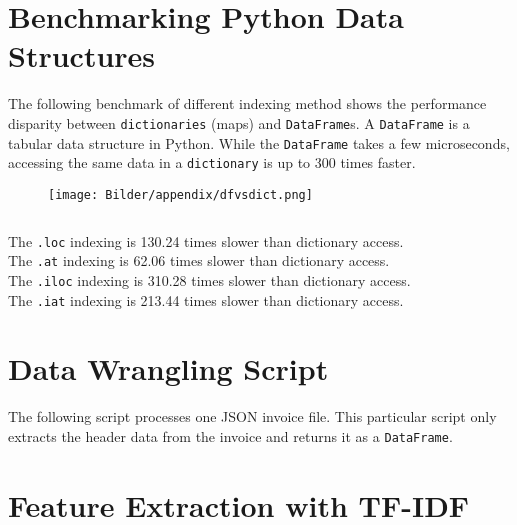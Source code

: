 \section{Benchmarking Python Data Structures}
\label{benchmarkDF}

The following benchmark of different indexing method shows the performance disparity between \lstinline|dictionaries| (maps) and \lstinline|DataFrame|s. A \lstinline|DataFrame| is a tabular data structure in Python. While the \lstinline|DataFrame| takes a few microseconds, accessing the same data in a \lstinline|dictionary| is up to 300 times faster.

\begin{figure}[h!]
	\texttt{[image: Bilder/appendix/dfvsdict.png]}
	\label{benchmarkDF}
\end{figure}
\begin{lstlisting}[caption={Benchmark of Indexing with Python Data Structures}]
\end{lstlisting}
The \lstinline|.loc| indexing is  130.24 times slower than dictionary access.\\
The \lstinline|.at|  indexing is  62.06 times slower than dictionary access.\\
The \lstinline|.iloc|  indexing is  310.28 times slower than dictionary access.\\
The \lstinline|.iat|  indexing is  213.44 times slower than dictionary access.

\newpage
\section{Data Wrangling Script}
The following script processes one \ac{JSON} invoice file. This particular script only extracts the header data from the invoice and returns it as a \lstinline|DataFrame|.



\newpage

\section{Feature Extraction with \ac{TF-IDF}}
\label{appendix:tfidf}

